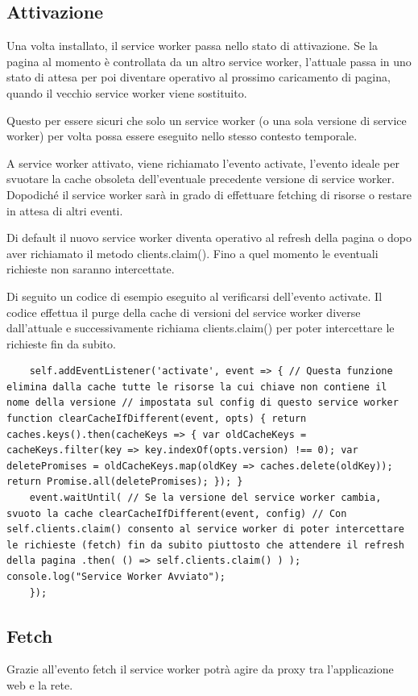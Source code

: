 \documentclass[italian]{article}
\begin{document}
\subsection{Attivazione}
Una volta installato, il service worker passa nello stato di attivazione. Se la pagina al momento è controllata da un altro service worker, l’attuale passa in uno stato di attesa per poi diventare operativo al prossimo caricamento di pagina, quando il vecchio service worker viene sostituito.

Questo per essere sicuri che solo un service worker (o una sola versione di service worker) per volta possa essere eseguito nello stesso contesto temporale.

A service worker attivato, viene richiamato l’evento activate, l’evento ideale per svuotare la cache obsoleta dell’eventuale precedente versione di service worker. Dopodiché il service worker sarà in grado di effettuare fetching di risorse o restare in attesa di altri eventi.

Di default il nuovo service worker diventa operativo al refresh della pagina o dopo aver richiamato il metodo clients.claim(). Fino a quel momento le eventuali richieste non saranno intercettate. 

Di seguito un codice di esempio eseguito al verificarsi dell’evento activate. Il codice effettua il purge della cache di versioni del service worker diverse dall’attuale e successivamente  richiama clients.claim() per poter intercettare le richieste fin da subito.

\begin{lstlisting}
	self.addEventListener('activate', event => { // Questa funzione elimina dalla cache tutte le risorse la cui chiave non contiene il nome della versione // impostata sul config di questo service worker function clearCacheIfDifferent(event, opts) { return caches.keys().then(cacheKeys => { var oldCacheKeys = cacheKeys.filter(key => key.indexOf(opts.version) !== 0); var deletePromises = oldCacheKeys.map(oldKey => caches.delete(oldKey)); return Promise.all(deletePromises); }); }
	event.waitUntil( // Se la versione del service worker cambia, svuoto la cache clearCacheIfDifferent(event, config) // Con self.clients.claim() consento al service worker di poter intercettare le richieste (fetch) fin da subito piuttosto che attendere il refresh della pagina .then( () => self.clients.claim() ) ); console.log("Service Worker Avviato");
	});
\end{lstlisting}

\subsection{Fetch}
Grazie all’evento fetch il service worker potrà agire da proxy tra l’applicazione web e la rete.
\end{document}
